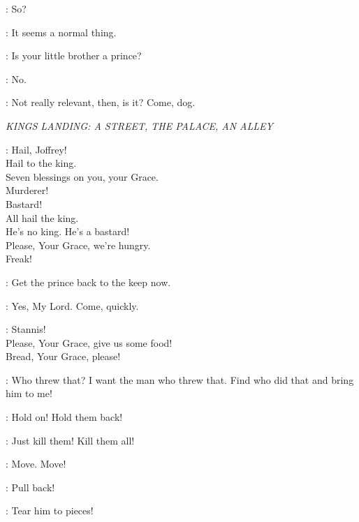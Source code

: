 \JOFFREY: So? 

\SANSA: It seems a normal thing. 

\JOFFREY: Is your little brother a prince? 

\SANSA: No. 

\JOFFREY: Not really relevant, then, is it?  Come, dog. 


\scene

\textit{KINGS LANDING: A STREET, THE PALACE, AN ALLEY} 


\CROWD: Hail, Joffrey!\\ 
Hail to the king.\\
Seven blessings on you, your Grace.\\
Murderer!\\
Bastard!\\
All hail the king.\\
He's no king. He's a bastard!\\
Please, Your Grace, we're hungry.\\
Freak!

\TYRION: Get the prince  back to the keep now. 

\LANNISTERGUARD: Yes, My Lord. Come, quickly. 

\CROWD: Stannis!\\
Please, Your Grace, give us some food!\\
Bread, Your Grace, please!


\JOFFREY: Who threw that? I want the man who threw that. Find who did that and bring him to me! 


\LANNISTERGUARD: Hold on! Hold them back! 

\JOFFREY: Just kill them! Kill them all! 


\TYRION: Move. Move! 

\LANNISTERGUARD: Pull back! 

\CROWD: Tear him to pieces!

